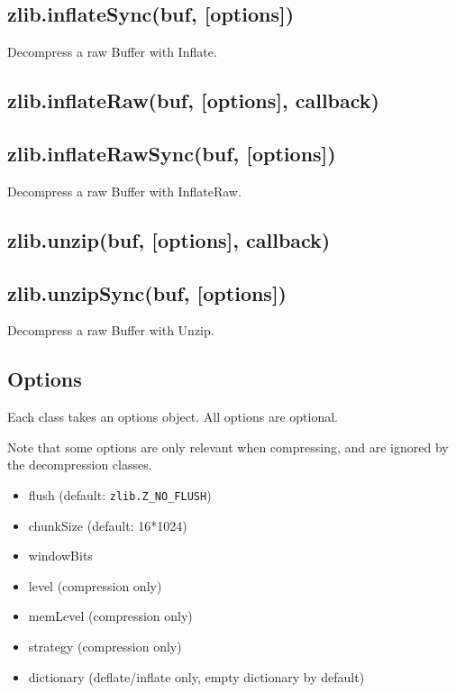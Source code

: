 \subsection{zlib.inflateSync(buf,
{[}options{]})}\label{zlib.inflatesyncbuf-options}

Decompress a raw Buffer with Inflate.

\subsection{zlib.inflateRaw(buf, {[}options{]},
callback)}\label{zlib.inflaterawbuf-options-callback}

\subsection{zlib.inflateRawSync(buf,
{[}options{]})}\label{zlib.inflaterawsyncbuf-options}

Decompress a raw Buffer with InflateRaw.

\subsection{zlib.unzip(buf, {[}options{]},
callback)}\label{zlib.unzipbuf-options-callback}

\subsection{zlib.unzipSync(buf,
{[}options{]})}\label{zlib.unzipsyncbuf-options}

Decompress a raw Buffer with Unzip.

\subsection{Options}\label{options}

Each class takes an options object. All options are optional.

Note that some options are only relevant when compressing, and are
ignored by the decompression classes.

\begin{itemize}
\itemsep1pt\parskip0pt
\item
  flush (default: \texttt{zlib.Z\_NO\_FLUSH})
\item
  chunkSize (default: 16*1024)
\item
  windowBits
\item
  level (compression only)
\item
  memLevel (compression only)
\item
  strategy (compression only)
\item
  dictionary (deflate/inflate only, empty dictionary by default)
\end{itemize}

